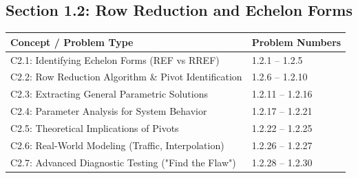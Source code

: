 \documentclass[11pt]{article}
\begin{document}
\subsection*{Section 1.2: Row Reduction and Echelon Forms}
\begin{table}[h]
\centering
\begin{tabular}{@{}ll@{}}
\toprule
\textbf{Concept / Problem Type} & \textbf{Problem Numbers} \\ \midrule
C2.1: Identifying Echelon Forms (REF vs RREF) & 1.2.1 -- 1.2.5 \\
C2.2: Row Reduction Algorithm \& Pivot Identification & 1.2.6 -- 1.2.10 \\
C2.3: Extracting General Parametric Solutions & 1.2.11 -- 1.2.16 \\
C2.4: Parameter Analysis for System Behavior & 1.2.17 -- 1.2.21 \\
C2.5: Theoretical Implications of Pivots & 1.2.22 -- 1.2.25 \\
C2.6: Real-World Modeling (Traffic, Interpolation) & 1.2.26 -- 1.2.27 \\
C2.7: Advanced Diagnostic Testing ("Find the Flaw") & 1.2.28 -- 1.2.30 \\ \bottomrule
\end{tabular}
\end{table}
\end{document}
